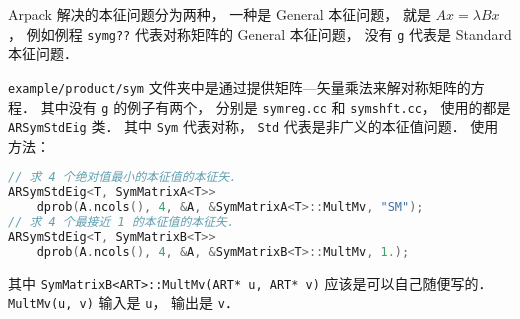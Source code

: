 Arpack 解决的本征问题分为两种， 一种是 General 本征问题， 就是 $Ax = \lambda Bx$， 例如例程 \verb|symg??| 代表对称矩阵的 General 本征问题， 没有 \verb|g| 代表是 Standard 本征问题．

\verb|example/product/sym| 文件夹中是通过提供矩阵—矢量乘法来解对称矩阵的方程． 其中没有 \verb|g| 的例子有两个， 分别是 \verb|symreg.cc| 和 \verb|symshft.cc|， 使用的都是 \verb|ARSymStdEig| 类． 其中 \verb|Sym| 代表对称， \verb|Std| 代表是非广义的本征值问题． 使用方法：
\begin{lstlisting}[language=cpp]
// 求 4 个绝对值最小的本征值的本征矢．
ARSymStdEig<T, SymMatrixA<T>>
    dprob(A.ncols(), 4, &A, &SymMatrixA<T>::MultMv, "SM");
// 求 4 个最接近 1 的本征值的本征矢．
ARSymStdEig<T, SymMatrixB<T>>
    dprob(A.ncols(), 4, &A, &SymMatrixB<T>::MultMv, 1.);
\end{lstlisting}
其中 \verb|SymMatrixB<ART>::MultMv(ART* u, ART* v)| 应该是可以自己随便写的． \verb|MultMv(u, v)| 输入是 \verb|u|， 输出是 \verb|v|．
